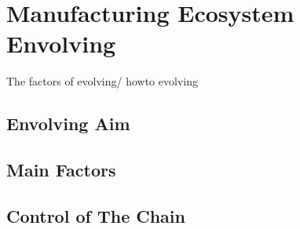 \section{Manufacturing Ecosystem Envolving} %
\label{sec:envolve}
The factors of evolving/ howto evolving

\subsection{Envolving Aim} %
\label{sub:envolving_aim}

\subsection{Main Factors} %
\label{sub:main_factors}


\subsection{Control of The Chain} %
\label{sub:control}

